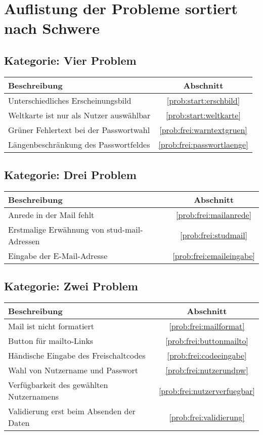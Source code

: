 \section{Auflistung der Probleme sortiert nach Schwere}

\subsection*{Kategorie: Vier Problem}
\begin{tabular}{|p{12cm}|c|}
\hline
\textbf{Beschreibung} & \textbf{Abschnitt} \\
\hline\hline
Unterschiedliches Erscheinungsbild & \ref{prob:start:erschbild} \\ 
Weltkarte ist nur als Nutzer auswählbar & \ref{prob:start:weltkarte} \\ 
Grüner Fehlertext bei der Passwortwahl & \ref{prob:frei:warntextgruen}\\
Längenbeschränkung des Passwortfeldes & \ref{prob:frei:passwortlaenge}\\
\hline
\end{tabular}

\subsection*{Kategorie: Drei Problem}
\begin{tabular}{|p{12cm}|c|}
\hline
\textbf{Beschreibung} & \textbf{Abschnitt} \\
\hline\hline
Anrede in der Mail fehlt & \ref{prob:frei:mailanrede}\\
Erstmalige Erwähnung von stud-mail-Adressen & \ref{prob:frei:studmail}\\
Eingabe der E-Mail-Adresse & \ref{prob:frei:emaileingabe}\\
\hline

\end{tabular}

\subsection*{Kategorie: Zwei Problem}
\begin{tabular}{|p{12cm}|c|}
\hline
\textbf{Beschreibung} & \textbf{Abschnitt} \\
\hline\hline
Mail ist nicht formatiert & \ref{prob:frei:mailformat}\\
Button für mailto-Links & \ref{prob:frei:buttonmailto}\\
Händische Eingabe des Freischaltcodes & \ref{prob:frei:codeeingabe}\\
Wahl von Nutzername und Passwort & \ref{prob:frei:nutzerundpw}\\
Verfügbarkeit des gewählten Nutzernamens & \ref{prob:frei:nutzerverfuegbar}\\
Validierung erst beim Absenden der Daten & \ref{prob:frei:validierung}\\
\hline

\end{tabular}

